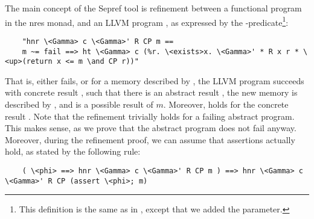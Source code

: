 \documentclass[runningheads]{llncs}
\begin{document}
  The main concept of the Sepref tool is refinement between a functional program  in the nres monad, and an LLVM program ,
  as expressed by the -predicate\footnote{This definition is the same as in \cite{La19-llvm}, except that we added the  parameter.}:
  \begin{lstlisting}
    "hnr \<Gamma> c \<Gamma>' R CP m ==
    m ~= fail ==> ht \<Gamma> c (%r. \<exists>x. \<Gamma>' * R x r * \<up>(return x <= m \and CP r))"
  \end{lstlisting}
  That is, either  fails, or for a memory described by , the LLVM program  succeeds with concrete result ,
  such that there is an abstract result , the new memory is described by , and
   is a possible result of \is$m$. Moreover,  holds for the concrete result .
  Note that the refinement trivially holds for a failing abstract program. This makes sense, as we prove that
  the abstract program does not fail anyway. Moreover, during the refinement proof, we can assume that
  assertions actually hold, as stated by the following rule:
  \begin{lstlisting}
    ( \<phi> ==> hnr \<Gamma> c \<Gamma>' R CP m ) ==> hnr \<Gamma> c \<Gamma>' R CP (assert \<phi>; m)
  \end{lstlisting}
\end{document}

